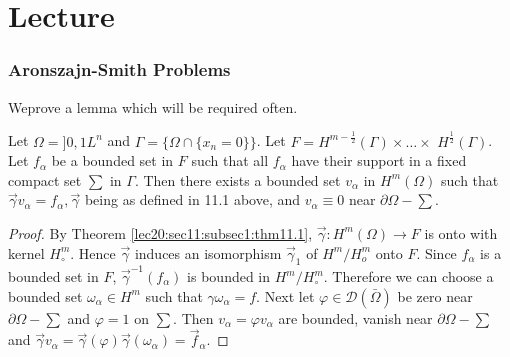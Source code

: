 \chapter{Lecture}\label{lec21}%

\setcounter{section}{11}

\subsection{Aronszajn-Smith Problems}\label{lec21:sec11:subsec2} 

We\pageoriginale prove a lemma which will be required often. 
\begin{lemma}\label{lec21:sec11:subsec2:lem11.1} %
  Let $\Omega = ]0, 1 L^n$ and $\Gamma = \{ \Omega \cap \{x_n =
    0\}\}$. Let $F = H^{m- \frac{1}{2}}(\Gamma) \times \ldots \times $ $
    H^{\frac{1}{2}} (\Gamma)$. Let $f_\alpha$ be a bounded set in $F$ such
    that all $f_\alpha$ have their support in a fixed compact set $\sum$
    in $\Gamma$. Then there exists a bounded set $v_\alpha$ in $H^m
    (\Omega)$ such that $\overset{\to}{\gamma} v_\alpha = f_\alpha ,
    \overset{\to}{\gamma} $ being as defined in 11.1 above, and
    $v_\alpha \equiv 0$ near $\partial \Omega - \sum$.  
\end{lemma}

\begin{proof}%
  By Theorem \ref{lec20:sec11:subsec1:thm11.1}, $\overset{\to}{\gamma} : H^m (\Omega) \to F$ is onto
  with kernel $H^m_\circ$. Hence $\overset{\to}{\gamma}$ induces an
  isomorphism $\overset{\to}{\gamma}_1$ of $H^m / H^m_o$ onto $F$. Since
  $f_\alpha$ is a bounded set in $F$, $\overset{\to}{\gamma}^{-1} (f_\alpha)$ is
  bounded in $H^m / H^m_\circ$. Therefore we can choose a bounded set
  $\omega_\alpha \in H^m$ such that $\gamma \omega_\alpha =
  f$. Next let $\varphi \in \mathscr{D}(\bar{\Omega})$ be zero
  near $\partial \Omega - \sum $ and $\varphi = 1$ on $\sum$. Then
  $v_\alpha = \varphi v_\alpha$ are bounded, vanish near $\partial
  \Omega - \sum$ and $\overset{\to}{\gamma}v_\alpha =
  \overset{\to}{\gamma} (\varphi) \overset{\to}{\gamma} (\omega_\alpha)
  = \overset{\to}{f}_{\alpha} $.  
\end{proof}

